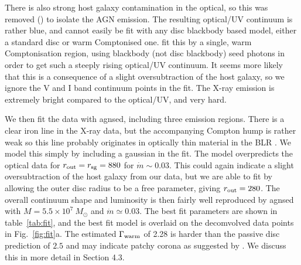 \documentclass[a4paper,fleqn,usenatbib]{mnras}
\begin{document}
There is also strong
host galaxy contamination in the optical, so this was removed
(\citealt[Fig. 10]{5548}) to isolate the AGN emission.  The resulting
optical/UV continuum is rather blue, and cannot easily be fit with any
disc blackbody based model, either a standard disc or warm Comptonised
one.  \cite{5548} fit this by a single, warm Comptonisation region,
using blackbody (not disc blackbody) seed photons in order to get such
a steeply rising optical/UV continuum. It seems more likely that this
is a consequence of a slight oversubtraction of the host galaxy, so we
ignore the V and I band continuum points in the fit. The X-ray
emission is extremely bright compared to the optical/UV, and very
hard.

We then fit the data with {\sc agnsed}, including three emission
regions. There is a clear iron line in the X-ray data, but the accompanying 
Compton hump is rather weak \citep{ursini2015,cappi2016} so this line probably originates in
optically thin material in the BLR \citep{yaqoob2001,brenneman2012,ursini2015}. 
We model this simply by
including a gaussian in the fit.  The model overpredicts the optical
data for $r_{\rm out}=r_{\rm sg}=880$ for $\dot{m}\sim
0.03$. This could again indicate a slight oversubtraction of the host
galaxy from our data, but we are able to fit by allowing the outer
disc radius to be a free parameter, giving $r_{\rm out}=280$.
The overall continuum shape and luminosity is then fairly well
reproduced by   {\sc agnsed}   with $M=5.5\times 10^7~M_\odot$ and
$\dot{m}\simeq0.03$.
The best fit parameters are shown in table~\ref{tab:fit}, and the best fit model is overlaid on the 
decomvolved data points in Fig.~\ref{fig:fit}a.
  The estimated $\Gamma_{\rm warm}$ of 2.28
  is harder than the passive disc prediction of $2.5$ and may indicate 
  patchy corona as suggested by \cite{petrucci2017}. 
  We discuss this in more detail in Section 4.3.
\end{document}
